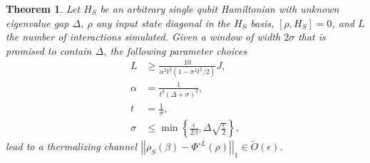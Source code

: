 \documentclass{article}
\newtheorem{theorem}{Theorem}
\newcommand{\norm}[1]{\left| \left| #1 \right| \right|}
\newcommand{\set}[1]{\left\{ #1 \right\}}
\newcommand{\bigotilde}[1]{\widetilde{O} \left( #1 \right)}
\begin{document}
\begin{theorem} \label{thm:single_qubit}
    Let $H_S$ be an arbitrary single qubit Hamiltonian with unknown eigenvalue gap $\Delta$, $\rho$ any input state diagonal in the $H_S$ basis, $[\rho, H_S] = 0$, and $L$ the number of interactions simulated. Given a window of width $2 \sigma$ that is promised to contain $\Delta$, the following parameter choices
    \begin{align}
    L &\ge \frac{10}{\alpha^2 t^2(1 - \sigma^2 t^2 / 2)} J, \\
    \alpha &= \frac{1}{t^3(\Delta + \sigma)^2}, \\
    t &= \frac{1}{\sigma}, \\
    \sigma &\le \min \set{\frac{\epsilon}{2 \beta}, \Delta \sqrt{\frac{\epsilon}{2}}}, 
    \end{align}
    lead to a thermalizing channel $\norm{\rho_S(\beta) - \Phi^{\circ L}(\rho)}_1 \in \bigotilde{\epsilon}$. 
\end{theorem}
\end{document}
